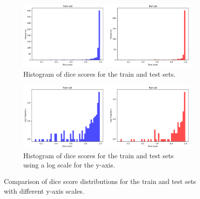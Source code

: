 \documentclass[11pt]{article}
\begin{document}
\begin{figure}[H]
    \centering
    \begin{subfigure}[t]{0.8\textwidth}
        \includegraphics[width=\textwidth]{figs/dice_score_histograms.png}
        \caption{Histogram of dice scores for the train and test sets.}
        \label{fig:normal_dice_dist_hist}
    \end{subfigure}
    \hfill
    \begin{subfigure}[t]{0.8\textwidth}
        \includegraphics[width=\textwidth]{figs/log_dice_score_histograms.png}
        \caption{Histogram of dice scores for the train and test sets using a log scale for the y-axis.}
        \label{fig:log_dice_dist_hist}
    \end{subfigure}
    \caption{Comparison of dice score distributions for the train and test sets with different y-axis scales.}
    \label{fig:dice_dist_hist}
\end{figure}
\end{document}
